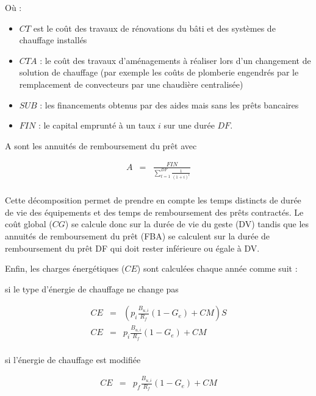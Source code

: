 \documentclass[10.5pt,a4paper]{article}
\begin{document}
{Où :
\begin{itemize}
\item $CT$ est le coût des travaux de rénovations du bâti et des systèmes de chauffage installés
\item $CTA$ : le coût des travaux d’aménagements à réaliser lors d’un changement de solution de chauffage (par exemple les coûts de plomberie engendrés par le remplacement de convecteurs par une chaudière centralisée)
\item $SUB$ : les financements obtenus par des aides mais sans les prêts bancaires
\item $FIN$ : le capital emprunté à un taux $i$ sur une durée $DF$. 
\end{itemize}

A sont les annuités de remboursement du prêt avec 

\begin{eqnarray}
 A &= & \frac{FIN} {\sum_{t = 1}^{DF} \frac{1}{(1+i)^t} }  \\
\end{eqnarray}

Cette décomposition permet de prendre en compte les temps distincts de durée de vie des équipements et des temps de remboursement des prêts contractés. Le coût global ($CG$) se calcule donc sur la durée de vie du geste (DV) tandis que les annuités de remboursement du prêt (FBA) se calculent sur la durée de remboursement du prêt DF qui doit rester inférieure ou égale à DV. 

Enfin, les charges énergétiques ($CE$) sont calculées chaque année comme suit :

si le type d’énergie de chauffage ne change pas

\begin{eqnarray}
	CE &= & (p_i  \frac{B_{u,i}}{R_f}(1-G_e) + CM)S \\
 CE &= & p_i  \frac{B_{u,i}}{R_f}(1-G_e) + CM   \\
\end{eqnarray}

si l’énergie de chauffage est modifiée

\begin{eqnarray}
 CE &= & p_f \frac{B_{u,i}}{R_f}(1-G_e) + CM   \\
\end{eqnarray}


}
\end{document}

